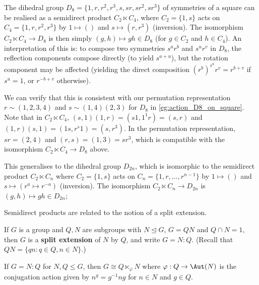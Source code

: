 \begin{example}\label{eg:D8_semidirect_product}
    The dihedral group $D_8 = \{1,r,r^2,r^3,s,sr,sr^2,sr^3\}$ of symmetries of a square can be realised as a semidirect product $C_2 \ltimes C_4$, where $C_2 = \{1,s\}$ acts on $C_4 = \{1,r,r^2,r^3\}$ by $1 \mapsto ()$ and $s \mapsto (r,r^3)$ (inversion). The isomorphism $C_2 \ltimes C_4 \to D_8$ is then simply $(g,h) \mapsto gh \in D_8$ (for $g \in C_2$ and $h \in C_4$). An interpretation of this is: to compose two symmetries $s^ar^b$ and $s^ur^v$ in $D_8$, the reflection components compose directly (to yield $s^{a+u}$), but the rotation component may be affected (yielding the direct composition $(r^b)^{s^u} r^v = r^{b+v}$ if $s^u = 1$, or $r^{-b+v}$ otherwise).

    We can verify that this is consistent with our permutation representation $r \sim (1,2,3,4)$ and $s \sim (1,4)(2,3)$ for $D_8$ in \autoref{eg:action_D8_on_square}. Note that in $C_2 \ltimes C_4$, $(s,1)(1,r) = (s1,1^1r) = (s,r)$ and $(1,r)(s,1) = (1s,r^s1) = (s,r^3)$. In the permutation representation, $sr = (2,4)$ and $(r,s) = (1,3) = sr^3$, which is compatible with the isomorphism $C_2 \ltimes C_4 \to D_8$ above.

    This generalises to the dihedral group $D_{2n}$, which is isomorphic to the semidirect product $C_2 \ltimes C_n$ where $C_2 = \{1,s\}$ acts on $C_n = \{1,r,\dotsc,r^{n-1}\}$ by $1 \mapsto ()$ and $s \mapsto (r^a \mapsto r^{-a})$ (inversion). The isomorphism $C_2 \ltimes C_n \to D_{2n}$ is $(g,h) \mapsto gh \in D_{2n}$; 
\end{example}

Semidirect products are related to the notion of a split extension.

\begin{definition}\label{def:split_extension}
    If $G$ is a group and $Q,N$ are subgroups with $N \unlhd G$, $G = QN$ and $Q \cap N = 1$, then $G$ is a \textbf{split extension} of $N$ by $Q$, and write $G = N : Q$.  (Recall that $QN = \{qn : q \in Q,n \in N\}$.)
\end{definition}

\begin{lemma}\label{lem:split_extensions_are_semidirect_products}
    If $G = N : Q$ for $N,Q \leq G$, then $G \cong Q \ltimes_\varphi N$ where $\varphi : Q \to \Aut(N)$ is the conjugation action given by $n^g = g^{-1}ng$ for $n \in N$ and $g \in Q$.
\end{lemma}

